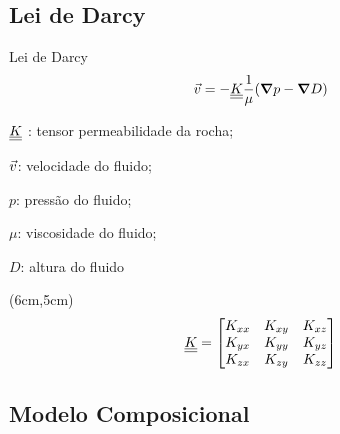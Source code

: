 \documentclass[professionalfont]{beamer}
\begin{document}
\subsection{Lei de Darcy}
\begin{frame}{Lei de Darcy}
    \begin{equation}
        \vec{v} = -\underline{\underline{K}} \dfrac{1}{\mu} (\mbox{\boldmath$ \nabla $} p - \mbox{\boldmath$ \nabla $} D)
    \end{equation}
    
    \vspace{0.3cm}
    
    \begin{description}[]
        \item $\underline{\underline{K}}$ : tensor permeabilidade da rocha;
        \item $\vec{v}$: velocidade do fluido;
        \item $p$: pressão do fluido;
        \item $\mu$: viscosidade do fluido;
        \item $D$: altura do fluido
    \end{description}
    
    \begin{textblock*}{.5\paperwidth}(6cm,5cm)
        \begin{align*}
            \underline{\underline{K}} = 
            \begin{bmatrix}
            	K_{xx} & K_{xy} & K_{xz} \\
            	K_{yx} & K_{yy} & K_{yz} \\
            	K_{zx} & K_{zy} & K_{zz}
	        \end{bmatrix}
        \end{align*}
    \end{textblock*}
    
\end{frame}



\subsection{Modelo Composicional}
\end{document}
